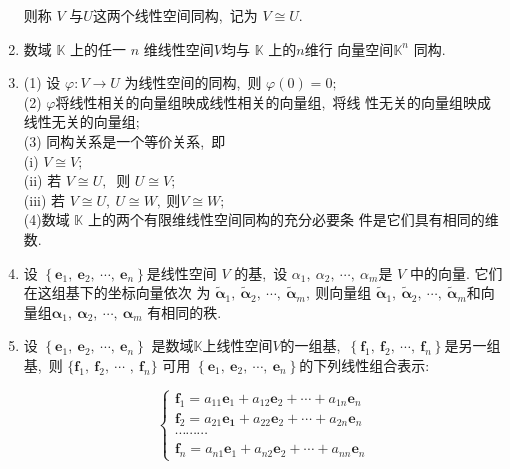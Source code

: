 \begin{enumerate}
		则称  $V$  与$  U  $这两个线性空间同构,\  记为  $V \cong U .$
		\item 数域 $ \mathbb{K}$  上的任一 $ n $ 维线性空间$  V $均与  $\mathbb{K} $ 上的$  n  $维行 向量空间$  \mathbb{K}^{n} $ 同构.
		\item (1) 设  $\varphi: V \rightarrow U $ 为线性空间的同构,\  则  $\varphi(0)=0 ;$\\
		(2) $ \varphi  $将线性相关的向量组映成线性相关的向量组,\  将线 性无关的向量组映成线性无关的向量组;\\
		(3) 同构关系是一个等价关系,\  即\\
		(i)  $V \cong V ;$\\
		(ii) 若  $V \cong U ,\ $ 则 $ U \cong V ;$\\
		(iii) 若  $V \cong U,\  U \cong W ,\  $则$  V \cong W ;$\\
		(4)数域  $\mathbb{K} $ 上的两个有限维线性空间同构的充分必要条 件是它们具有相同的维数.
		\item 设 $ \left\{\boldsymbol{e}_{1},\  \boldsymbol{e}_{2},\  \cdots,\  \boldsymbol{e}_{n}\right\} $是线性空间  $V$  的基,\ 设 $ \alpha_{1},\  \alpha_{2},\  \cdots  ,\ \alpha_{m}  $是 $ V $ 中的向量. 它们在这组基下的坐标向量依次 为 $ \widetilde{\boldsymbol{\alpha}}_1,\  \widetilde{\boldsymbol{\alpha}}_2,\  \cdots,\  \widetilde{\boldsymbol{\alpha}}_m ,\  $则向量组  $\widetilde{\boldsymbol{\alpha}}_1,\  \widetilde{\boldsymbol{\alpha}}_2,\  \cdots,\  \widetilde{\boldsymbol{\alpha}}_m  $和向量组$  \boldsymbol{\alpha}_1,\  \boldsymbol{\alpha}_2,\  \cdots,\  \boldsymbol{\alpha}_m $ 有相同的秩.
		\item 设  $\left\{\boldsymbol{e}_1,\  \boldsymbol{e}_2,\  \cdots,\  \boldsymbol{e}_n\right\} $ 是数域$  \mathbb{K}  $上线性空间$  V  $的一组基,\   $\left\{\boldsymbol{f}_1,\  \boldsymbol{f}_2,\  \cdots,\  \boldsymbol{f}_n\right\}  $是另一组基,\  则 $ \{\boldsymbol{f}_1,\  \boldsymbol{f}_2,\  \cdots$ $,\ \boldsymbol{f}_n\} $ 可用  $\left\{\boldsymbol{e}_1,\  \boldsymbol{e}_2,\  \cdots,\  \boldsymbol{e}_n\right\}  $的下列线性组合表示:
		
		$$\left\{\begin{array}{c}
			\boldsymbol{f}_1=a_{11} \boldsymbol{e}_1+a_{12} \boldsymbol{e}_2+\cdots+a_{1 n} \boldsymbol{e}_n \\
			\boldsymbol{f}_2=a_{21} \boldsymbol{e_1}+a_{22} \boldsymbol{e}_2+\cdots+a_{2 n} \boldsymbol{e}_n \\
			\cdots \cdots \cdots \\
			\boldsymbol{f}_n=a_{n 1} \boldsymbol{e}_1+a_{n 2} \boldsymbol{e}_2+\cdots+a_{n n} \boldsymbol{e}_n
		\end{array}\right.$$
		

\end{enumerate}
